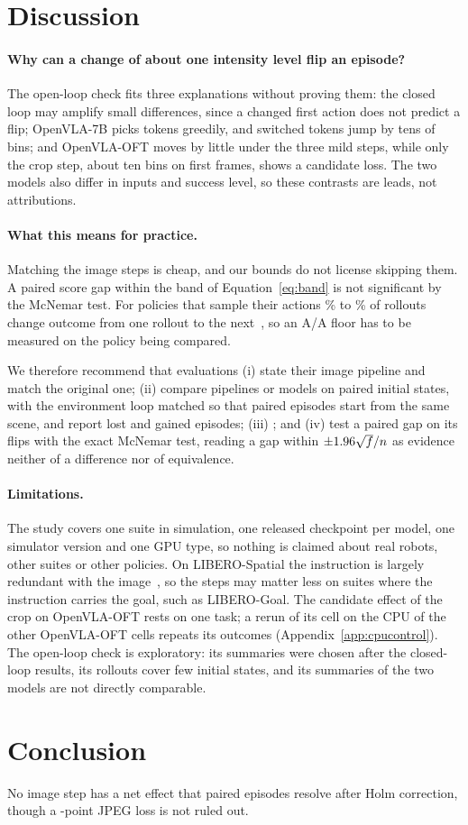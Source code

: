 \section{Discussion}
\label{sec:discussion}

\paragraph{Why can a change of about one intensity level flip an episode?} The open-loop check fits three explanations without proving them: the closed loop may amplify small differences, since a changed first action does not predict a flip; OpenVLA-7B picks tokens greedily, and switched tokens jump by tens of bins; and OpenVLA-OFT moves by little under the three mild steps, while only the crop step, about ten bins on first frames, shows a candidate loss. The two models also differ in inputs and success level, so these contrasts are leads, not attributions.

\paragraph{What this means for practice.} Matching the image steps is cheap, and our bounds do not license skipping them. \HookPractice{} A paired score gap within the band of Equation~\eqref{eq:band} is not significant by the McNemar test. For policies that sample their actions \ExtCtrlSampledLo\% to \ExtCtrlSampledHi\% of rollouts change outcome from one rollout to the next~\citep{liberoctrlrepo}, so an A/A floor has to be measured on the policy being compared.

We therefore recommend that evaluations (i) state their image pipeline and match the original one; (ii) compare pipelines or models on paired initial states, with the environment loop matched so that paired episodes start from the same scene, and report lost and gained episodes; (iii) \HookRecThree; and (iv) test a paired gap on its flips with the exact McNemar test, reading a gap within $\pm 1.96\sqrt{f}/n$ as evidence neither of a difference nor of equivalence.

\paragraph{Limitations.} The study covers one suite in simulation, one released checkpoint per model, one simulator version and one GPU type, so nothing is claimed about real robots, other suites or other policies. On LIBERO-Spatial the instruction is largely redundant with the image~\citep{xie2026language}, so the steps may matter less on suites where the instruction carries the goal, such as LIBERO-Goal. The candidate effect of the crop on OpenVLA-OFT rests on one task; a rerun of its cell on the CPU of the other OpenVLA-OFT cells repeats its outcomes (Appendix~\ref{app:cpucontrol}).\HookCpuLimit{}\HookShamLimit{}
The open-loop check is exploratory: its summaries were chosen after the closed-loop results, its rollouts cover few initial states, and its summaries of the two models are not directly comparable.

\section{Conclusion}
\label{sec:conclusion}

No image step has a net effect that \NPairs{} paired episodes resolve after Holm correction, though a \ThresholdPts-point JPEG loss is not ruled out. \HookConclusionFlips
